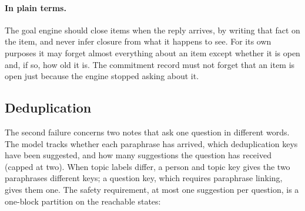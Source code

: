 \documentclass[11pt]{article}
\newcommand{\plain}{\paragraph{In plain terms.}}
\theoremstyle{definition}
\theoremstyle{plain}
\begin{document}
\plain The goal engine should close items when the reply arrives, by writing that fact on the item,
and never infer closure from what it happens to see. For its own purposes it may forget almost
everything about an item except whether it is open and, if so, how old it is. The commitment record
must not forget that an item is open just because the engine stopped asking about it.

\subsection{Deduplication}\label{sec:dedupe}

The second failure concerns two notes that ask one question in different words. The model tracks
whether each paraphrase has arrived, which deduplication keys have been suggested, and how many
suggestions the question has received (capped at two). When topic labels differ, a person and
topic key gives the two paraphrases different keys; a question key, which requires paraphrase
linking, gives them one. The safety requirement, at most one suggestion per question, is a one-block
partition on the reachable states:
\end{document}
